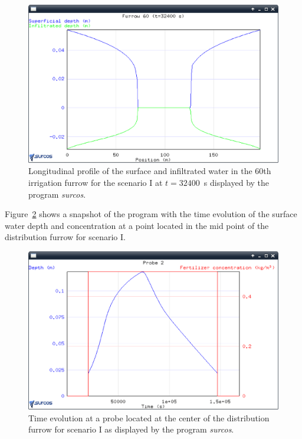 \documentclass[review,authoryear]{elsarticle}
\begin{document}
\begin{figure}[!ht]
\begin{center}
\includegraphics[width=\textwidth]{evoSurcoEN.eps}
\caption{Longitudinal profile of the surface and infiltrated
water in the 60th irrigation furrow for the scenario I at $t=32400$~s displayed by
the program \emph{surcos}.}\label{evo2}
\end{center}
\end{figure}

Figure~\ref{evoSonda} shows a snapshot of the program with the time evolution of
the surface water depth and concentration at a point located in the mid point of
the distribution furrow for scenario I. 
\begin{figure}[!ht]
\begin{center}
\includegraphics[width=\textwidth]{evoSondaEN.eps}
\caption{Time evolution at a probe located at the center of the distribution
furrow for scenario I as displayed by the program \emph{surcos}.}\label{evoSonda}
\end{center}
\end{figure}
\end{document}

